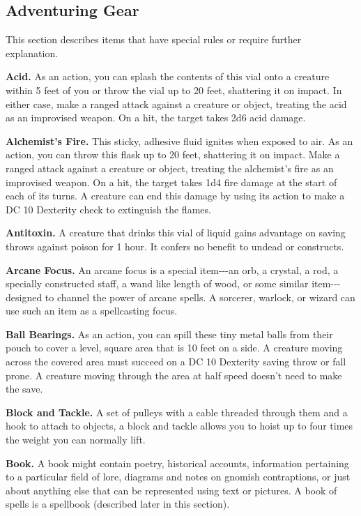 \documentclass[
]{article}
\begin{document}
\hypertarget{adventuring-gear}{%
\subsection{Adventuring Gear}\label{adventuring-gear}}

This section describes items that have special rules or require further
explanation.

\textbf{Acid.} As an action, you can splash the contents of this vial
onto a creature within 5 feet of you or throw the vial up to 20 feet,
shattering it on impact. In either case, make a ranged attack against a
creature or object, treating the acid as an improvised weapon. On a hit,
the target takes 2d6 acid damage.

\textbf{Alchemist's Fire.} This sticky, adhesive fluid ignites when
exposed to air. As an action, you can throw this flask up to 20 feet,
shattering it on impact. Make a ranged attack against a creature or
object, treating the alchemist's fire as an improvised weapon. On a hit,
the target takes 1d4 fire damage at the start of each of its turns. A
creature can end this damage by using its action to make a DC 10
Dexterity check to extinguish the flames.

\textbf{Antitoxin.} A creature that drinks this vial of liquid gains
advantage on saving throws against poison for 1 hour. It confers no
benefit to undead or constructs.

\textbf{Arcane Focus.} An arcane focus is a special item-\/-\/-an orb, a
crystal, a rod, a specially constructed staff, a wand like length of
wood, or some similar item-\/-\/-designed to channel the power of arcane
spells. A sorcerer, warlock, or wizard can use such an item as a
spellcasting focus.

\textbf{Ball Bearings.} As an action, you can spill these tiny metal
balls from their pouch to cover a level, square area that is 10 feet on
a side. A creature moving across the covered area must succeed on a DC
10 Dexterity saving throw or fall prone. A creature moving through the
area at half speed doesn't need to make the save.

\textbf{Block and Tackle.} A set of pulleys with a cable threaded
through them and a hook to attach to objects, a block and tackle allows
you to hoist up to four times the weight you can normally lift.

\textbf{Book.} A book might contain poetry, historical accounts,
information pertaining to a particular field of lore, diagrams and notes
on gnomish contraptions, or just about anything else that can be
represented using text or pictures. A book of spells is a spellbook
(described later in this section).
\end{document}
